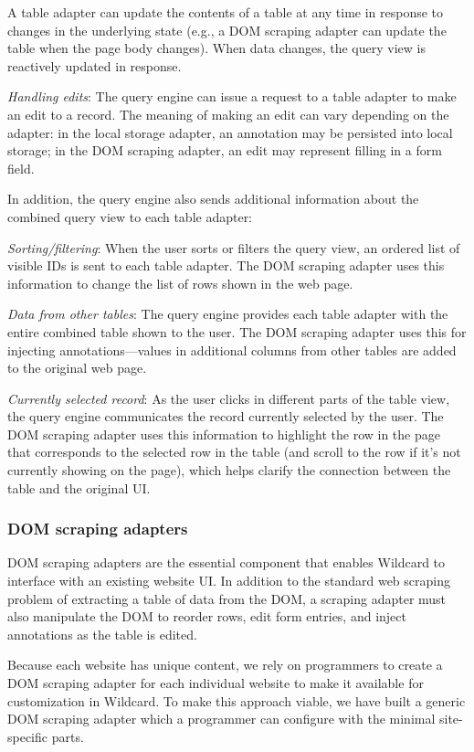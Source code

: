 \documentclass[sigplan,screen,10pt,anonymous,review]{acmart}
\begin{document}
A table adapter can update the contents of a table at any time in
response to changes in the underlying state (e.g., a DOM scraping
adapter can update the table when the page body changes). When data
changes, the query view is reactively updated in response.

\emph{Handling edits}: The query engine can issue a request to a table
adapter to make an edit to a record. The meaning of making an edit can
vary depending on the adapter: in the local storage adapter, an
annotation may be persisted into local storage; in the DOM scraping
adapter, an edit may represent filling in a form field.

In addition, the query engine also sends additional information about
the combined query view to each table adapter:

\emph{Sorting/filtering}: When the user sorts or filters the query view,
an ordered list of visible IDs is sent to each table adapter. The DOM
scraping adapter uses this information to change the list of rows shown
in the web page.

\emph{Data from other tables}: The query engine provides each table
adapter with the entire combined table shown to the user. The DOM
scraping adapter uses this for injecting annotations---values in
additional columns from other tables are added to the original web page.

\emph{Currently selected record}: As the user clicks in different parts
of the table view, the query engine communicates the record currently
selected by the user. The DOM scraping adapter uses this information to
highlight the row in the page that corresponds to the selected row in
the table (and scroll to the row if it's not currently showing on the
page), which helps clarify the connection between the table and the
original UI.

\hypertarget{dom-scraping-adapters}{%
\subsubsection{DOM scraping adapters}\label{dom-scraping-adapters}}

DOM scraping adapters are the essential component that enables Wildcard
to interface with an existing website UI. In addition to the standard
web scraping problem of extracting a table of data from the DOM, a
scraping adapter must also manipulate the DOM to reorder rows, edit form
entries, and inject annotations as the table is edited.

Because each website has unique content, we rely on programmers to
create a DOM scraping adapter for each individual website to make it
available for customization in Wildcard. To make this approach viable,
we have built a generic DOM scraping adapter which a programmer can
configure with the minimal site-specific parts.
\end{document}
